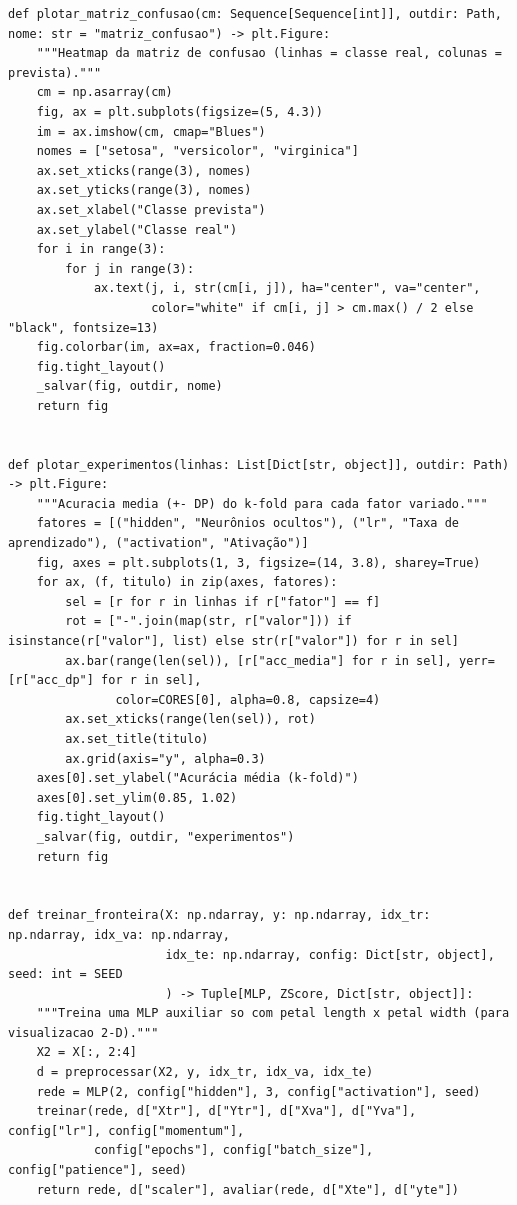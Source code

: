 \documentclass[12pt,a4paper]{article}
\begin{document}
{\begin{lstlisting}[caption={Programa completo \texttt{iris\_mlp.py}.},label={lst:iris_mlp}]
def plotar_matriz_confusao(cm: Sequence[Sequence[int]], outdir: Path, nome: str = "matriz_confusao") -> plt.Figure:
    """Heatmap da matriz de confusao (linhas = classe real, colunas = prevista)."""
    cm = np.asarray(cm)
    fig, ax = plt.subplots(figsize=(5, 4.3))
    im = ax.imshow(cm, cmap="Blues")
    nomes = ["setosa", "versicolor", "virginica"]
    ax.set_xticks(range(3), nomes)
    ax.set_yticks(range(3), nomes)
    ax.set_xlabel("Classe prevista")
    ax.set_ylabel("Classe real")
    for i in range(3):
        for j in range(3):
            ax.text(j, i, str(cm[i, j]), ha="center", va="center",
                    color="white" if cm[i, j] > cm.max() / 2 else "black", fontsize=13)
    fig.colorbar(im, ax=ax, fraction=0.046)
    fig.tight_layout()
    _salvar(fig, outdir, nome)
    return fig


def plotar_experimentos(linhas: List[Dict[str, object]], outdir: Path) -> plt.Figure:
    """Acuracia media (+- DP) do k-fold para cada fator variado."""
    fatores = [("hidden", "Neurônios ocultos"), ("lr", "Taxa de aprendizado"), ("activation", "Ativação")]
    fig, axes = plt.subplots(1, 3, figsize=(14, 3.8), sharey=True)
    for ax, (f, titulo) in zip(axes, fatores):
        sel = [r for r in linhas if r["fator"] == f]
        rot = ["-".join(map(str, r["valor"])) if isinstance(r["valor"], list) else str(r["valor"]) for r in sel]
        ax.bar(range(len(sel)), [r["acc_media"] for r in sel], yerr=[r["acc_dp"] for r in sel],
               color=CORES[0], alpha=0.8, capsize=4)
        ax.set_xticks(range(len(sel)), rot)
        ax.set_title(titulo)
        ax.grid(axis="y", alpha=0.3)
    axes[0].set_ylabel("Acurácia média (k-fold)")
    axes[0].set_ylim(0.85, 1.02)
    fig.tight_layout()
    _salvar(fig, outdir, "experimentos")
    return fig


def treinar_fronteira(X: np.ndarray, y: np.ndarray, idx_tr: np.ndarray, idx_va: np.ndarray,
                      idx_te: np.ndarray, config: Dict[str, object], seed: int = SEED
                      ) -> Tuple[MLP, ZScore, Dict[str, object]]:
    """Treina uma MLP auxiliar so com petal length x petal width (para visualizacao 2-D)."""
    X2 = X[:, 2:4]
    d = preprocessar(X2, y, idx_tr, idx_va, idx_te)
    rede = MLP(2, config["hidden"], 3, config["activation"], seed)
    treinar(rede, d["Xtr"], d["Ytr"], d["Xva"], d["Yva"], config["lr"], config["momentum"],
            config["epochs"], config["batch_size"], config["patience"], seed)
    return rede, d["scaler"], avaliar(rede, d["Xte"], d["yte"])



\end{lstlisting}}
\end{document}
